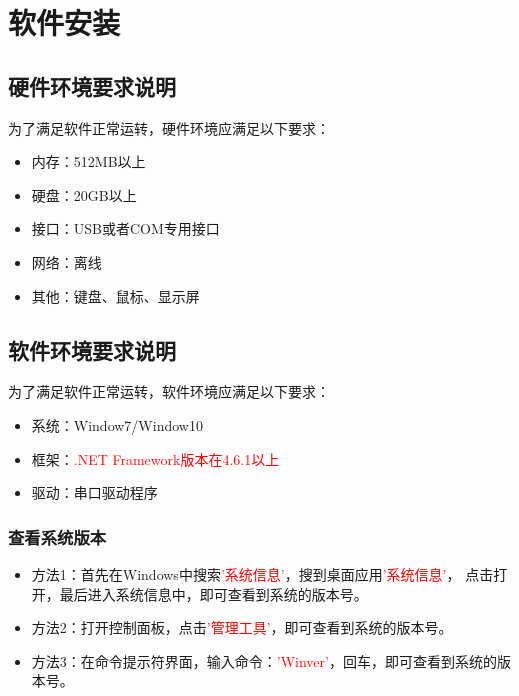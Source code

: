 \chapter{软件安装}
\section{硬件环境要求说明}
为了满足软件正常运转，硬件环境应满足以下要求：
\begin{itemize}
    \item  内存：512MB以上
    \item  硬盘：20GB以上
    \item  接口：USB或者COM专用接口
    \item  网络：离线
    \item  其他：键盘、鼠标、显示屏
\end{itemize}

\section{软件环境要求说明}
为了满足软件正常运转，软件环境应满足以下要求：
\begin{itemize}
    \item  系统：Window7/Window10
    \item  框架：\textcolor{red}{.NET Framework版本在4.6.1以上}
    \item  驱动：串口驱动程序
\end{itemize}
\subsection{查看系统版本}
\begin{itemize}
    \item 方法1：首先在Windows中搜索\textcolor{red}{'系统信息'}，搜到桌面应用\textcolor{red}{'系统信息'}，
点击打开，最后进入系统信息中，即可查看到系统的版本号。
    \item 方法2：打开控制面板，点击\textcolor{red}{'管理工具'}，即可查看到系统的版本号。
    \item 方法3：在命令提示符界面，输入命令：\textcolor{red}{'Winver'}，回车，即可查看到系统的版本号。
\end{itemize}
